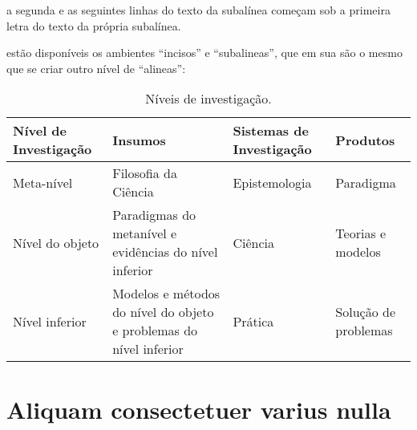 \documentclass[12pt,openright,twoside,a4paper]{abntex2}
\begin{document}
\begin{alineas}
\begin{alineas}
     \item a segunda e as seguintes linhas do texto da subalínea começam sob a
     primeira letra do texto da própria subalínea.
  \end{alineas}
  
  \item estão disponíveis os ambientes ``incisos'' e ``subalineas'', que em sua
  são o mesmo que se criar outro nível de ``alineas'':
  
  \begin{incisos}
    \item \lipsum[52]
  \end{incisos}
  
  \item \lipsum[60]
  
  \begin{subalineas}
    \item \lipsum[53]
  \end{subalineas}
  
  \item \lipsum[54]
  
\end{alineas}

\lipsum[4]

\begin{table}[htb]
\footnotesize
\caption[Níveis de investigação]{\footnotesize{Níveis de investigação.
\cite{van86}}}
\label{tab-nivinv}
\begin{tabular}{p{2.6cm}|p{6.0cm}|p{2.25cm}|p{3.40cm}}
   \textbf{Nível de Investigação} & \textbf{Insumos}  & \textbf{Sistemas de Investigação}  & \textbf{Produtos}  \\
    \hline
    Meta-nível & Filosofia\index{Filosofia} da Ciência  & Epistemologia &
    Paradigma  \\
    \hline
    Nível do objeto & Paradigmas do metanível e evidências do nível inferior &
    Ciência  & Teorias e modelos \\
    \hline
    Nível inferior & Modelos e métodos do nível do objeto e problemas do nível inferior & Prática & Solução de problemas  \\
\end{tabular}
\end{table}

\lipsum[5]

\section{Aliquam consectetuer varius nulla}
\end{document}
